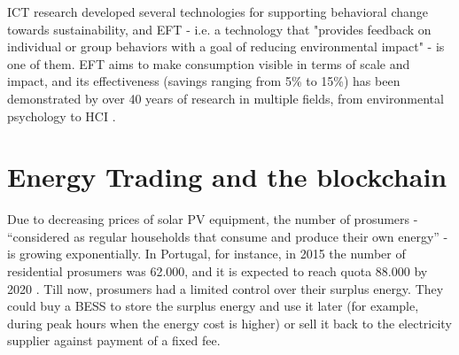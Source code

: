 \ac{ICT} research developed several technologies for supporting behavioral change towards sustainability, and \ac{EFT} - i.e. a technology that "provides feedback on individual or group behaviors with a goal of reducing environmental impact" \cite{Froehlich2010} - is one of them. \ac{EFT} aims to make consumption visible in terms of scale and impact, and its effectiveness (savings ranging from 5\% to 15\%) has been demonstrated by over 40 years of research in multiple fields, from environmental psychology to \ac{HCI} \cite{Wang1990, Darby2006, Froehlich2010}.

\section{Energy Trading and the blockchain}

Due to decreasing prices of solar \ac{PV} equipment, the number of prosumers - “considered as regular households that consume and produce their own energy” \cite{Prosumers} - is growing exponentially. In Portugal, for instance, in 2015 the number of residential prosumers was 62.000, and it is expected to reach quota 88.000 by 2020 \cite{EuropeanComissionStudy}. Till now, prosumers had a limited control over their surplus energy. They could buy a \ac{BESS} to store the surplus energy and use it later (for example, during peak hours when the energy cost is higher) or sell it back to the electricity supplier against payment of a fixed fee.




